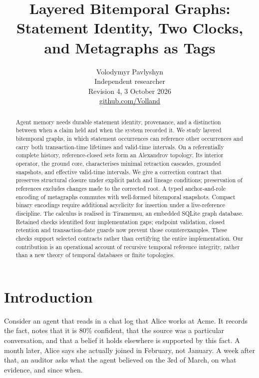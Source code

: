 \documentclass[11pt]{article}
\title{Layered Bitemporal Graphs:\\
Statement Identity, Two Clocks, and Metagraphs as Tags}
\author{Volodymyr Pavlyshyn\\[2pt]
\small Independent researcher\\
\small Revision 4, 3 October 2026\\
\small \href{https://github.com/Volland}{github.com/Volland}}
\date{}
\theoremstyle{plain}
\theoremstyle{definition}
\theoremstyle{remark}
\begin{document}
\maketitle

\begin{abstract}
Agent memory needs durable statement identity, provenance, and a distinction
between when a claim held and when the system recorded it. We study layered
bitemporal graphs, in which statement occurrences can reference other
occurrences and carry both transaction-time lifetimes and valid-time intervals.
On a referentially complete history, reference-closed sets form an Alexandrov
topology. Its interior operator, the ground core, characterises minimal
retraction cascades, grounded snapshots, and effective valid-time intervals.
We give a correction contract that preserves structural closure under explicit
patch and lineage conditions; preservation of references excludes changes made
to the corrected root. A typed anchor-and-role encoding of metagraphs commutes
with well-formed bitemporal snapshots. Compact binary encodings require additional
acyclicity for insertion under a live-reference discipline. The calculus is
realised in Tiramemsu, an embedded SQLite graph database. Retained checks
identified four implementation gaps; endpoint validation, closed retention and
transaction-date guards now prevent those counterexamples. These checks support
selected contracts rather than certifying the entire implementation. Our contribution is an operational account of recursive temporal
reference integrity, rather than a new theory of temporal databases or finite
topologies.

\end{abstract}

\section{Introduction}\label{sec:intro}

Consider an agent that reads in a chat log that Alice works at Acme. It records
the fact, notes that it is 80\% confident, that the source was a particular
conversation, and that a belief it holds elsewhere is supported by this fact.
A month later, Alice says she actually joined in February, not January. A week
after that, an auditor asks what the agent believed on the 3rd of March, on
what evidence, and since when.
\end{document}
